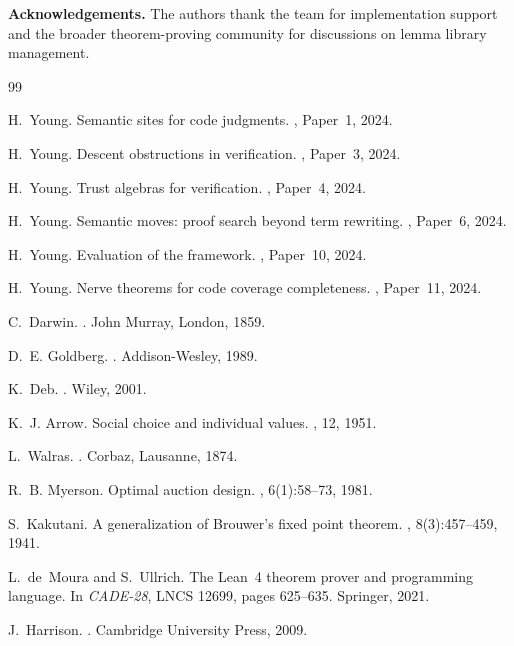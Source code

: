 \documentclass[11pt]{article}
\begin{document}
\bigskip
\noindent\textbf{Acknowledgements.}
The authors thank the \JuGeo{} team for implementation support and
the broader theorem-proving community for discussions on lemma library
management.

\begin{thebibliography}{99}

H.~Young.
\newblock Semantic sites for code judgments.
, Paper~1, 2024.

H.~Young.
\newblock Descent obstructions in verification.
, Paper~3, 2024.

H.~Young.
\newblock Trust algebras for verification.
, Paper~4, 2024.

H.~Young.
\newblock Semantic moves: proof search beyond term rewriting.
, Paper~6, 2024.

H.~Young.
\newblock Evaluation of the \JuGeo{} framework.
, Paper~10, 2024.

H.~Young.
\newblock Nerve theorems for code coverage completeness.
, Paper~11, 2024.

C.~Darwin.
.
\newblock John Murray, London, 1859.

D.~E. Goldberg.
.
\newblock Addison-Wesley, 1989.

K.~Deb.
.
\newblock Wiley, 2001.

K.~J. Arrow.
\newblock Social choice and individual values.
, 12, 1951.

L.~Walras.
.
\newblock Corbaz, Lausanne, 1874.

R.~B. Myerson.
\newblock Optimal auction design.
, 6(1):58--73, 1981.

S.~Kakutani.
\newblock A generalization of {Brouwer}'s fixed point theorem.
, 8(3):457--459, 1941.

L.~de~Moura and S.~Ullrich.
\newblock The {Lean~4} theorem prover and programming language.
\newblock In {\em CADE-28}, LNCS 12699, pages 625--635. Springer, 2021.

J.~Harrison.
.
\newblock Cambridge University Press, 2009.

\end{thebibliography}
\end{document}
